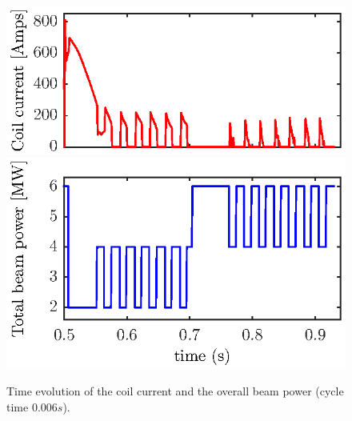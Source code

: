 \documentclass[12pt,lot, lof]{puthesis}
\begin{document}
\begin{figure}[htbp]
	\centering
	\includegraphics[width=0.7 \linewidth]{fig19a}  \\[-0.5em]
	\includegraphics[width=0.7 \linewidth]{fig19b} 
	\caption{Time evolution of the coil current and the overall beam power (cycle time $0.006 s$). }
	\label{res2}
\end{figure}
\end{document}
